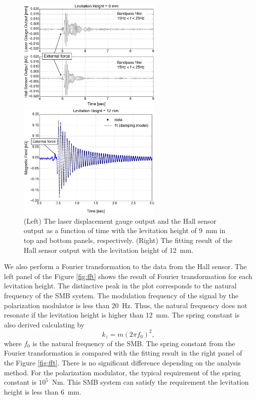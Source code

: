 \documentclass[a4paper]{jpconf}
\begin{document}
\begin{figure}[htbp]
  \centering
  \begin{minipage}{0.45\hsize}
  \includegraphics[width=70mm]{vibration_up.eps}
  \end{minipage}
  \begin{minipage}{0.45\hsize}
    \centering
    \includegraphics[width=70mm]{vibration_fit.eps}
  \end{minipage}
  \caption{(Left) The laser displacement gauge output and the Hall sensor output as a function of time with the levitation height of 9~mm in top and bottom panels, respectively.
    (Right) The fitting result of the Hall sensor output with the levitation height of 12~mm.}
  \label{fig:vibration}
\end{figure}

We also perform a Fourier transformation to the data from the Hall sensor.
The left panel of the Figure \ref{fig:fft} shows the result of Fourier transformation for each levitation height.
The distinctive peak in the plot corresponds to the natural frequency of the SMB system.
The modulation frequency of the signal by the polarization modulator is less than 20~Hz.
Thus, the natural frequency does not resonate if the levitation height is higher than 12~mm.
The spring constant is also derived calculating by
\begin{equation}
  k_{z} = m (2 \pi f_{0})^{2},
\end{equation}
where $f_{0}$ is the natural frequency of the SMB.
The spring constant from the Fourier transformation is compared with the fitting result in the right panel of the Figure \ref{fig:fft}.
There is no significant difference depending on the analysis method.
For the polarization modulator, the typical requirement of the spring constant is $10^{5}$~Nm.
This SMB system can satisfy the requirement the levitation height is less than 6~mm.
\end{document}
